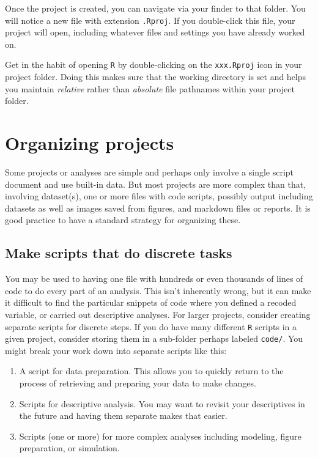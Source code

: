 \documentclass[
]{book}
\providecommand{\tightlist}{%
  \setlength{\itemsep}{0pt}\setlength{\parskip}{0pt}}
\newenvironment{rmdtip}[1]
  {
  \begin{itemize}
  \renewcommand{\labelitemi}{
    \raisebox{-.7\height}[0pt][0pt]{
      {\setkeys{Gin}{width=3em,keepaspectratio}\texttt{[image: images/\#1]}}
    }
  }
  \setlength{\fboxsep}{1em}
  \begin{tip}
  \item
  }
  {
  \end{tip}
  \end{itemize}
  }
\begin{document}
Once the project is created, you can navigate via your finder to that folder. You will notice a new file with extension \texttt{.Rproj}. If you double-click this file, your project will open, including whatever files and settings you have already worked on.

\begin{rmdtip}{tip}
Get in the habit of opening \texttt{R} by double-clicking on the \texttt{xxx.Rproj} icon in your project folder. Doing this makes sure that the working directory is set and helps you maintain \emph{relative} rather than \emph{absolute} file pathnames within your project folder.

\end{rmdtip}

\hypertarget{organizing-projects}{%
\section{Organizing projects}\label{organizing-projects}}

Some projects or analyses are simple and perhaps only involve a single script document and use built-in data. But most projects are more complex than that, involving dataset(s), one or more files with code scripts, possibly output including datasets as well as images saved from figures, and markdown files or reports. It is good practice to have a standard strategy for organizing these.

\hypertarget{make-scripts-that-do-discrete-tasks}{%
\subsection{Make scripts that do discrete tasks}\label{make-scripts-that-do-discrete-tasks}}

You may be used to having one file with hundreds or even thousands of lines of code to do every part of an analysis. This isn't inherently wrong, but it can make it difficult to find the particular snippets of code where you defined a recoded variable, or carried out descriptive analyses. For larger projects, consider creating separate scripts for discrete steps. If you do have many different \texttt{R} scripts in a given project, consider storing them in a sub-folder perhaps labeled \texttt{code/}. You might break your work down into separate scripts like this:

\begin{enumerate}
\def\labelenumi{\arabic{enumi}.}
\tightlist
\item
  A script for data preparation. This allows you to quickly return to the process of retrieving and preparing your data to make changes.
\item
  Scripts for descriptive analysis. You may want to revisit your descriptives in the future and having them separate makes that easier.
\item
  Scripts (one or more) for more complex analyses including modeling, figure preparation, or simulation.
\end{enumerate}
\end{document}
